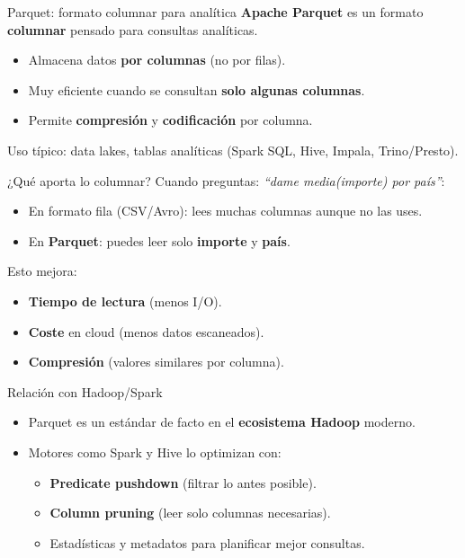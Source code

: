 \documentclass{beamer}
\begin{document}
\begin{frame}{Parquet: formato columnar para analítica}
\textbf{Apache Parquet} es un formato \textbf{columnar} pensado para consultas analíticas.

\begin{itemize}
    \item Almacena datos \textbf{por columnas} (no por filas).
    \item Muy eficiente cuando se consultan \textbf{solo algunas columnas}.
    \item Permite \textbf{compresión} y \textbf{codificación} por columna.
\end{itemize}

\medskip
Uso típico: data lakes, tablas analíticas (Spark SQL, Hive, Impala, Trino/Presto).
\end{frame}

\begin{frame}{¿Qué aporta lo columnar?}
Cuando preguntas: \emph{``dame media(importe) por país''}:

\begin{itemize}
    \item En formato fila (CSV/Avro): lees muchas columnas aunque no las uses.
    \item En \textbf{Parquet}: puedes leer solo \textbf{importe} y \textbf{país}.
\end{itemize}

\medskip
Esto mejora:
\begin{itemize}
    \item \textbf{Tiempo de lectura} (menos I/O).
    \item \textbf{Coste} en cloud (menos datos escaneados).
    \item \textbf{Compresión} (valores similares por columna).
\end{itemize}
\end{frame}

\begin{frame}{Relación con Hadoop/Spark}
\begin{itemize}
    \item Parquet es un estándar de facto en el \textbf{ecosistema Hadoop} moderno.
    \item Motores como Spark y Hive lo optimizan con:
    \begin{itemize}
        \item \textbf{Predicate pushdown} (filtrar lo antes posible).
        \item \textbf{Column pruning} (leer solo columnas necesarias).
        \item Estadísticas y metadatos para planificar mejor consultas.
    \end{itemize}
\end{itemize}
\end{frame}
\end{document}
